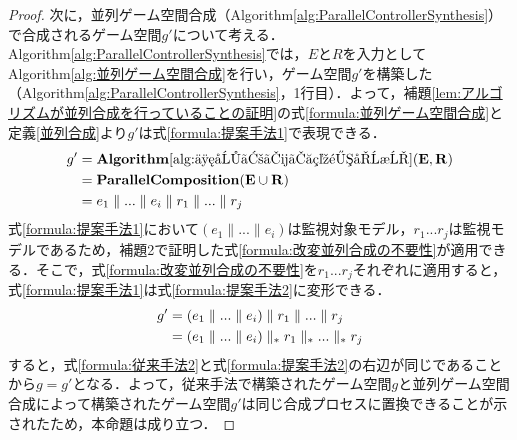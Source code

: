 \begin{proof}
    次に，並列ゲーム空間合成（Algorithm\ref{alg:ParallelControllerSynthesis}）で合成されるゲーム空間$g'$について考える．Algorithm\ref{alg:ParallelControllerSynthesis}では，$E$と$R$を入力としてAlgorithm\ref{alg:並列ゲーム空間合成}を行い，ゲーム空間$g'$を構築した（Algorithm\ref{alg:ParallelControllerSynthesis}，1行目）．よって，補題\ref{lem:アルゴリズムが並列合成を行っていることの証明}の式\ref{formula:並列ゲーム空間合成}と定義\ref{並列合成}より$g'$は式\ref{formula:提案手法1}で表現できる．
    \renewcommand{\baselinestretch}{0.0}
    \allowdisplaybreaks[4]
    \begin{align}
    \label{formula:提案手法1}
    g'  &= {\bf Algorithm \ref{alg:並列ゲーム空間合成}(E, R)} \notag\\
        &= {\bf Parallel Composition(E \cup R)} \notag\\
        &= e_1 \parallel ... \parallel e_i \parallel r_1 \parallel ... \parallel r_j
    \end{align}
    \allowdisplaybreaks[0]
    \renewcommand{\baselinestretch}{1}
    式\ref{formula:提案手法1}において$(e_1 \parallel ... \parallel e_i)$は監視対象モデル，$r_1 ... r_j$は監視モデルであるため，補題2で証明した式\ref{formula:改変並列合成の不要性}が適用できる．そこで，式\ref{formula:改変並列合成の不要性}を$r_1 ... r_j$それぞれに適用すると，式\ref{formula:提案手法1}は式\ref{formula:提案手法2}に変形できる．
    \renewcommand{\baselinestretch}{0.0}
    \allowdisplaybreaks[4]
    \begin{align}
    \label{formula:提案手法2}
     g' &= (e_1 \parallel ... \parallel e_i) \parallel r_1 \parallel ... \parallel r_j \notag\\
        &= (e_1 \parallel ... \parallel e_i) \parallel_* r_1 \parallel_* ... \parallel_* r_j
    \end{align}
    \allowdisplaybreaks[0]
    \renewcommand{\baselinestretch}{1}
    すると，式\ref{formula:従来手法2}と式\ref{formula:提案手法2}の右辺が同じであることから$g = g'$となる．よって，従来手法で構築されたゲーム空間$g$と並列ゲーム空間合成によって構築されたゲーム空間$g'$は同じ合成プロセスに置換できることが示されたため，本命題は成り立つ．
\end{proof}


